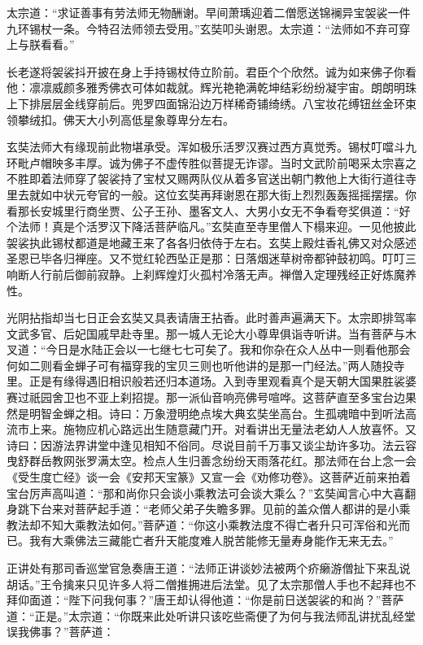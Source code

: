 \documentclass[12pt,UTF8]{ctexbook}
\begin{document}
{太宗道：“求证善事有劳法师无物酬谢。早间萧瑀迎着二僧愿送锦襕异宝袈裟一件九环锡杖一条。今特召法师领去受用。”玄奘叩头谢恩。太宗道：“法师如不弃可穿上与朕看看。”

长老遂将袈裟抖开披在身上手持锡杖侍立阶前。君臣个个欣然。诚为如来佛子你看他：凛凛威颜多雅秀佛衣可体如裁就。辉光艳艳满乾坤结彩纷纷凝宇宙。朗朗明珠上下排层层金线穿前后。兜罗四面锦沿边万样稀奇铺绮绣。八宝妆花缚钮丝金环束领攀绒扣。佛天大小列高低星象尊卑分左右。

玄奘法师大有缘现前此物堪承受。浑如极乐活罗汉赛过西方真觉秀。锡杖叮噹斗九环毗卢帽映多丰厚。诚为佛子不虚传胜似菩提无诈谬。当时文武阶前喝采太宗喜之不胜即着法师穿了袈裟持了宝杖又赐两队仪从着多官送出朝门教他上大街行道往寺里去就如中状元夸官的一般。这位玄奘再拜谢恩在那大街上烈烈轰轰摇摇摆摆。你看那长安城里行商坐贾、公子王孙、墨客文人、大男小女无不争看夸奖俱道：“好个法师！真是个活罗汉下降活菩萨临凡。”玄奘直至寺里僧人下榻来迎。一见他披此袈裟执此锡杖都道是地藏王来了各各归依侍于左右。玄奘上殿炷香礼佛又对众感述圣恩已毕各归禅座。又不觉红轮西坠正是那：日落烟迷草树帝都钟鼓初鸣。叮叮三响断人行前后御前寂静。上刹辉煌灯火孤村冷落无声。禅僧入定理残经正好炼魔养性。

光阴拈指却当七日正会玄奘又具表请唐王拈香。此时善声遍满天下。太宗即排驾率文武多官、后妃国戚早赴寺里。那一城人无论大小尊卑俱诣寺听讲。当有菩萨与木叉道：“今日是水陆正会以一七继七七可矣了。我和你杂在众人丛中一则看他那会何如二则看金蝉子可有福穿我的宝贝三则也听他讲的是那一门经法。”两人随投寺里。正是有缘得遇旧相识般若还归本道场。入到寺里观看真个是天朝大国果胜裟婆赛过祇园舍卫也不亚上刹招提。那一派仙音响亮佛号喧哗。这菩萨直至多宝台边果然是明智金蝉之相。诗曰：万象澄明绝点埃大典玄奘坐高台。生孤魂暗中到听法高流市上来。施物应机心路远出生随意藏门开。对看讲出无量法老幼人人放喜怀。又诗曰：因游法界讲堂中逢见相知不俗同。尽说目前千万事又谈尘劫许多功。法云容曳舒群岳教网张罗满太空。检点人生归善念纷纷天雨落花红。那法师在台上念一会《受生度亡经》谈一会《安邦天宝篆》又宣一会《劝修功卷》。这菩萨近前来拍着宝台厉声高叫道：“那和尚你只会谈小乘教法可会谈大乘么？”玄奘闻言心中大喜翻身跳下台来对菩萨起手道：“老师父弟子失瞻多罪。见前的盖众僧人都讲的是小乘教法却不知大乘教法如何。”菩萨道：“你这小乘教法度不得亡者升只可浑俗和光而已。我有大乘佛法三藏能亡者升天能度难人脱苦能修无量寿身能作无来无去。”

正讲处有那司香巡堂官急奏唐王道：“法师正讲谈妙法被两个疥癞游僧扯下来乱说胡话。”王令擒来只见许多人将二僧推拥进后法堂。见了太宗那僧人手也不起拜也不拜仰面道：“陛下问我何事？”唐王却认得他道：“你是前日送袈裟的和尚？”菩萨道：“正是。”太宗道：“你既来此处听讲只该吃些斋便了为何与我法师乱讲扰乱经堂误我佛事？”菩萨道：

}
\end{document}
